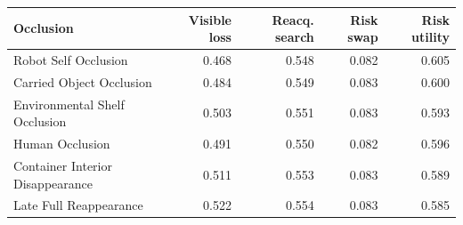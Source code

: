 \begin{tabular}{lrrrr}
\toprule
Occlusion & Visible loss & Reacq. search & Risk swap & Risk utility \\
\midrule
Robot Self Occlusion & 0.468 & 0.548 & 0.082 & 0.605 \\
Carried Object Occlusion & 0.484 & 0.549 & 0.083 & 0.600 \\
Environmental Shelf Occlusion & 0.503 & 0.551 & 0.083 & 0.593 \\
Human Occlusion & 0.491 & 0.550 & 0.082 & 0.596 \\
Container Interior Disappearance & 0.511 & 0.553 & 0.083 & 0.589 \\
Late Full Reappearance & 0.522 & 0.554 & 0.083 & 0.585 \\
\bottomrule
\end{tabular}
